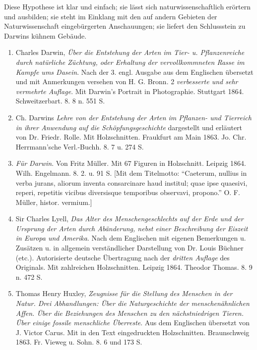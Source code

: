 \documentclass[a4paper, 11pt, oneside, english]{article}
\begin{document}
Diese Hypothese ist klar und einfach; sie lässt sich naturwissenschaftlich erörtern und ausbilden; sie steht im Einklang mit den auf andern Gebieten der Naturwissenschaft eingebürgerten Anschauungen; sie liefert den Schlussstein zu Darwins kühnem Gebäude.
\clearpage
\begin{enumerate}
    \item Charles Darwin, \emph{Über die Entstehung der Arten im Tier- u. Pflanzenreiche durch natürliche Züchtung, oder Erhaltung der vervollkommneten Rasse im Kampfe ums Dasein}. Nach der 3. engl. Ausgabe aus dem Englischen übersetzt und mit Anmerkungen versehen von H. G. Bronn. 2 \emph{verbesserte und sehr vermehrte Auflage}. Mit Darwin's Portrait in Photographie. Stuttgart 1864. Schweitzerbart. 8. 8 n. 551 S.

    \item Ch. Darwins \emph{Lehre von der Entstehung der Arten im Pflanzen- und Tierreich in ihrer Anwendung auf die Schöpfungsgeschichte} dargestellt und erläutert von Dr. Friedr. Rolle. Mit Holzschnitten. Fraukfurt am Main 1863. Jo. Chr. Herrmann'sche Verl.-Buchh. 8. 7 u. 274 S.

    \item \emph{Für Darwin}. Von Fritz Müller. Mit 67 Figuren in Holzschnitt. Leipzig 1864. Wilh. Engelmann. 8. 2. u. 91 S. [Mit dem Titelmotto: "`Caeterum, nullius in verba jurans, aliorum inventa consarcinare haud institul; quae ipse quaesivi, reperi, repetitis vicibus diversisque temporibus observavi, propono."' O. F. Müller, histor. vermium.]

    \item Sir Charles Lyell, \emph{Das Alter des Menschengeschlechts auf der Erde und der Ursprung der Arten durch Abänderung, nebst einer Beschreibung der Eiszeit in Europa und Amerika}. Nach dem Englischen mit eigenen Bemerkungen u. Zusätzen u. in allgemein verständlicher Darstellung von Dr. Louis Büchner (etc.). Autorisierte deutsche Übertragung nach der \emph{dritten Auflage} des Originals. Mit zahlreichen Holzschnitten. Leipzig 1864. Theodor Thomas. 8. 9 n. 472 S.

    \item Thomas Henry Huxley, \emph{Zeugnisse für die Stellung des Menschen in der Natur. Drei Abhandlungen: Über die Naturgeschichte der menschenähnlichen Affen. Über die Beziehungen des Menschen zu den nächstniedrigen Tieren. Über einige fossile menschliche Überreste}. Aus dem Englischen übersetzt von J. Victor Carus. Mit in den Text eingedruckten Holzschnitten. Braunschweig 1863. Fr. Vieweg u. Sohn. 8. 6 und 173 S.


\end{enumerate}
\end{document}
